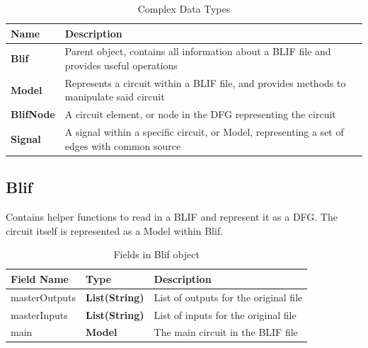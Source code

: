 \documentclass[12pt,final,oneside,a4paper]{dwThesis} %
\begin{document}
   \begin{table}
      \begin{center}

      \begin{tabularx}
         {\linewidth}{lX} \toprule Name &
         Description\\
         \midrule
         \textbf{Blif} & Parent object, contains all information
         about a \gls{BLIF} file and provides useful operations \\
         \textbf{Model} &
         Represents a circuit within a \gls{BLIF} file, and provides methods to
         manipulate said circuit \\
         \textbf{BlifNode} & A circuit element, or node in
         the \gls{DFG} representing the circuit \\
         \textbf{Signal} & A signal within a
         specific circuit, or Model, representing a set of edges with common
         source \\
         \bottomrule 
      \end{tabularx}
      \caption{Complex Data Types}\label{complexTypes}

   \end{center}\end{table}



   \subsection{Blif}
   Contains helper functions to read in a \gls{BLIF} and
   represent it as a \gls{DFG}.  The circuit itself is represented as a Model
   within Blif.  
   \begin{table}
      \begin{center}

      \begin{tabularx}
         {\linewidth}{llX} \toprule Field
         Name & Type & Description\\
         \midrule masterOutputs &
         \textbf{List(String)} & List of outputs for the original file \\

         masterInputs & \textbf{List(String)} & List of inputs for the original
         file \\
         main & \textbf{Model} & The main circuit in the \gls{BLIF}
         file\\
         \bottomrule 
      \end{tabularx}
      \caption{Fields in Blif object}

   \end{center}\end{table}
\end{document}
